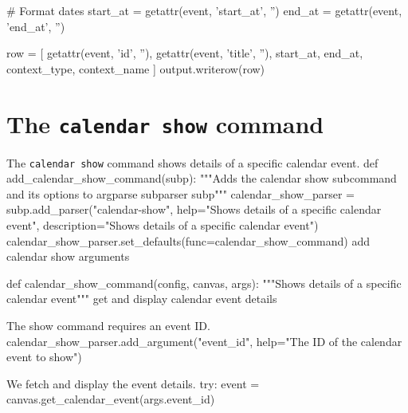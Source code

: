 # Format dates
start_at = getattr(event, 'start_at', '')
end_at = getattr(event, 'end_at', '')

row = [
  getattr(event, 'id', ''),
  getattr(event, 'title', ''),
  start_at,
  end_at,
  context_type,
  context_name
]
output.writerow(row)
\nwendcode{}\nwdocspar


\section{The \texttt{calendar show} command}

The \texttt{calendar show} command shows details of a specific calendar event.
\nwenddocs{}\plusendmoddef\nwstartdeflinemarkup{}\nwenddeflinemarkup
def add_calendar_show_command(subp):
  """Adds the calendar show subcommand and its options to argparse subparser subp"""
  calendar_show_parser = subp.add_parser("calendar-show",
    help="Shows details of a specific calendar event",
    description="Shows details of a specific calendar event")
  calendar_show_parser.set_defaults(func=calendar_show_command)
  \LA{}add calendar show arguments~{\nwtagstyle{}}\RA{}

def calendar_show_command(config, canvas, args):
  """Shows details of a specific calendar event"""
  \LA{}get and display calendar event details~{\nwtagstyle{}}\RA{}
\nwendcode{}\nwdocspar

The show command requires an event ID.
\nwenddocs{}\endmoddef\nwstartdeflinemarkup{}\nwenddeflinemarkup
calendar_show_parser.add_argument("event_id",
  help="The ID of the calendar event to show")
\nwendcode{}\nwdocspar

We fetch and display the event details.
\nwenddocs{}\endmoddef\nwstartdeflinemarkup{}\nwenddeflinemarkup
try:
  event = canvas.get_calendar_event(args.event_id)
  
